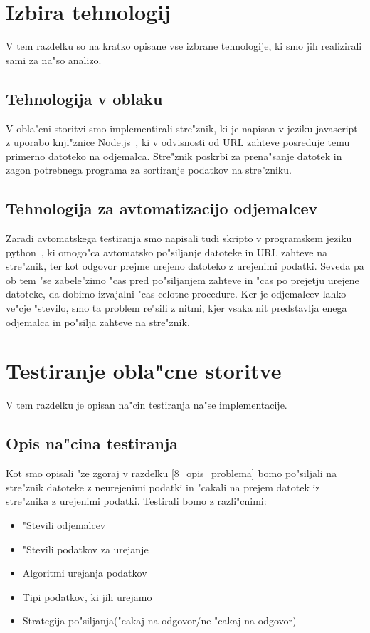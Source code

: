 \section{Izbira tehnologij}
V tem razdelku so na kratko opisane vse izbrane tehnologije, ki smo jih realizirali sami za na"so analizo.

\subsection{Tehnologija v oblaku}
V obla"cni storitvi smo implementirali stre"znik, ki je napisan v jeziku javascript z uporabo knji"znice Node.js~\cite{8_nodejs}, ki v odvisnosti od URL zahteve posreduje temu primerno datoteko na odjemalca. Stre"znik poskrbi za prena"sanje datotek in zagon potrebnega programa za sortiranje podatkov na stre"zniku.

\subsection{Tehnologija za avtomatizacijo odjemalcev}
Zaradi avtomatskega testiranja smo napisali tudi skripto v programskem jeziku python~\cite{8_python}, ki omogo"ca avtomatsko po"siljanje datoteke in URL zahteve na stre"znik, ter kot odgovor prejme urejeno datoteko z urejenimi podatki. Seveda pa ob tem "se zabele"zimo "cas pred po"siljanjem zahteve in "cas po prejetju urejene datoteke, da dobimo izvajalni "cas celotne procedure. Ker je odjemalcev lahko ve"cje "stevilo, smo ta problem re"sili z nitmi, kjer vsaka nit predstavlja enega odjemalca in po"silja zahteve na stre"znik.

\section{Testiranje obla"cne storitve}
V tem razdelku je opisan na"cin testiranja na"se implementacije.

\subsection{Opis na"cina testiranja}
Kot smo opisali "ze zgoraj v razdelku \ref{8_opis_problema} bomo po"siljali na stre"znik datoteke z neurejenimi podatki in "cakali na prejem datotek iz stre"znika z urejenimi podatki. Testirali bomo z razli"cnimi:
\begin{itemize}
  \item "Stevili odjemalcev
  \item "Stevili podatkov za urejanje
  \item Algoritmi urejanja podatkov
  \item Tipi podatkov, ki jih urejamo
  \item Strategija po"siljanja("cakaj na odgovor/ne "cakaj na odgovor)
\end{itemize}



